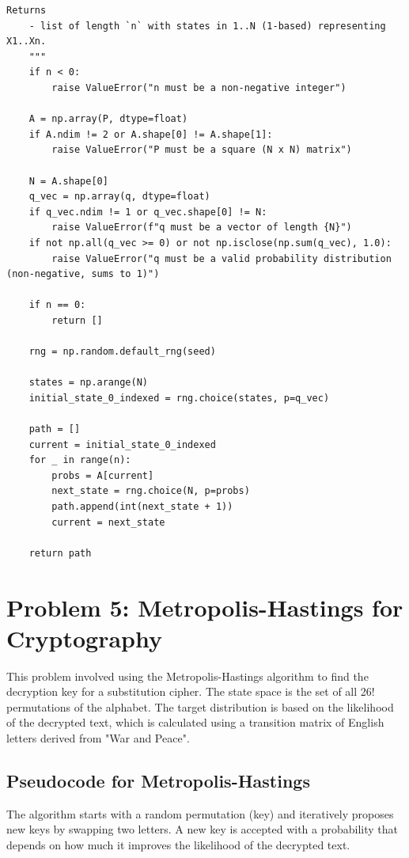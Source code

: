 \documentclass{article}
\begin{document}
\begin{lstlisting}[style=py, caption={Updated \texttt{f} and \texttt{g} functions from \texttt{MATH541PS1/HW1/markov.py}}]
    Returns
    - list of length `n` with states in 1..N (1-based) representing X1..Xn.
    """
    if n < 0:
        raise ValueError("n must be a non-negative integer")

    A = np.array(P, dtype=float)
    if A.ndim != 2 or A.shape[0] != A.shape[1]:
        raise ValueError("P must be a square (N x N) matrix")

    N = A.shape[0]
    q_vec = np.array(q, dtype=float)
    if q_vec.ndim != 1 or q_vec.shape[0] != N:
        raise ValueError(f"q must be a vector of length {N}")
    if not np.all(q_vec >= 0) or not np.isclose(np.sum(q_vec), 1.0):
        raise ValueError("q must be a valid probability distribution (non-negative, sums to 1)")

    if n == 0:
        return []

    rng = np.random.default_rng(seed)
    
    states = np.arange(N)
    initial_state_0_indexed = rng.choice(states, p=q_vec)

    path = []
    current = initial_state_0_indexed
    for _ in range(n):
        probs = A[current]
        next_state = rng.choice(N, p=probs)
        path.append(int(next_state + 1))
        current = next_state

    return path
\end{lstlisting}

\section*{Problem 5: Metropolis-Hastings for Cryptography}
This problem involved using the Metropolis-Hastings algorithm to find the decryption key for a substitution cipher. The state space is the set of all 26! permutations of the alphabet. The target distribution is based on the likelihood of the decrypted text, which is calculated using a transition matrix of English letters derived from "War and Peace".

\subsection*{Pseudocode for Metropolis-Hastings}
The algorithm starts with a random permutation (key) and iteratively proposes new keys by swapping two letters. A new key is accepted with a probability that depends on how much it improves the likelihood of the decrypted text.
\end{document}
